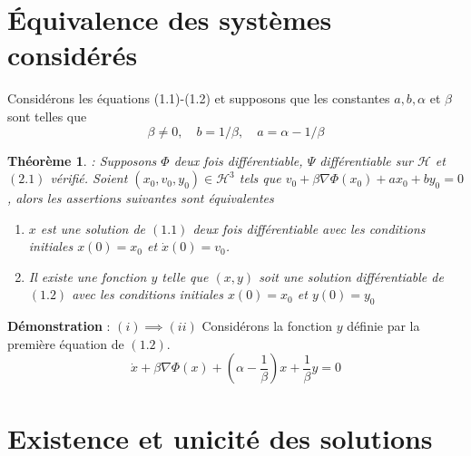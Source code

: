 \documentclass[a4paper,11pt]{book}
\theoremstyle{theo}
\newtheorem{theorem}{Théorème}[section]
\newcommand*{\Hi}{\mathcal{H}}
\begin{document}
\section{Équivalence des systèmes considérés}
Considérons les équations (1.1)-(1.2) et supposons que les constantes $a,b,\alpha$ et $\beta$ sont telles que 
\begin{equation} \beta \neq 0, \quad b=1/\beta, \quad a=\alpha-1/\beta \end{equation}
\begin{theorem} : Supposons $\Phi$ deux fois différentiable, $\Psi$ différentiable sur $\Hi$ et $(2.1)$ vérifié. Soient $(x_0,v_0,y_0)\in\Hi^3$ tels que $v_0+\beta\nabla\Phi(x_0) + ax_0+by_0=0$, alors les assertions suivantes sont équivalentes 
\begin{enumerate}[label=(\roman*)]
\item $x$ est une solution de $(1.1)$ deux fois différentiable avec les conditions initiales $x(0)=x_0$ et $\dot{x}(0)=v_0$.
\item Il existe une fonction $y$ telle que $(x,y)$ soit une solution différentiable de $(1.2)$ avec les conditions initiales $x(0)=x_0$ et $y(0)=y_0$
\end{enumerate}
\end{theorem}
\noindent\textbf{Démonstration} : \quad $(i)\implies (ii)$ Considérons la fonction $y$ définie par la première équation de $(1.2)$.
\begin{equation}
 \dot{x}+\beta\nabla\Phi(x) + \left(\alpha-\frac{1}{\beta}\right)x + \frac{1}{\beta}y=0
\end{equation}
\section{Existence et unicité des solutions }
\end{document}
